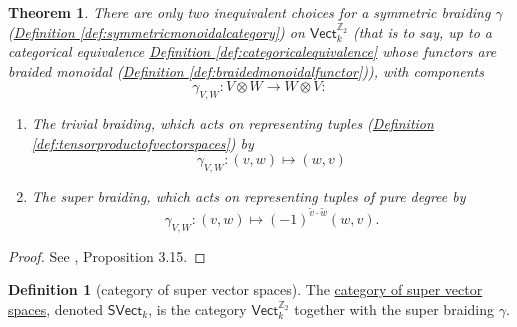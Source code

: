 \documentclass[a4paper,10pt]{scrreprt}
\newcommand{\Z}{\mathbb{Z}}
\newcommand{\defn}[1]{\ul{#1}}
\theoremstyle{definition}
\newtheorem{definition}{Definition}[section]
\theoremstyle{plain}
\newtheorem{theorem}{Theorem}[section]
\theoremstyle{remark}
\begin{document}
\begin{theorem}
  There are only two inequivalent choices for a symmetric braiding $\gamma$ (\hyperref[def:symmetricmonoidalcategory]{Definition \ref*{def:symmetricmonoidalcategory}}) on $\mathsf{Vect}_{k}^{\Z_{2}}$ (that is to say, up to a categorical equivalence \hyperref[def:categoricalequivalence]{Definition \ref*{def:categoricalequivalence}} whose functors are braided monoidal (\hyperref[def:braidedmonoidalfunctor]{Definition \ref*{def:braidedmonoidalfunctor}})),  with components
  \begin{equation*}
    \gamma_{V,W}\colon V \otimes W \to W \otimes V:
  \end{equation*}

  \begin{enumerate}
    \item The \emph{trivial braiding}, which acts on representing tuples (\hyperref[def:tensorproductofvectorspaces]{Definition \ref*{def:tensorproductofvectorspaces}}) by 
      \begin{equation*}
        \gamma_{V, W}\colon (v, w) \mapsto (w, v)
      \end{equation*}

    \item The \emph{super braiding}, which acts on representing tuples of pure degree by
      \begin{equation*}
        \gamma_{V, W}\colon (v, w) \mapsto (-1)^{\tilde{v}\cdot \tilde{w}}(w, v).
      \end{equation*}
  \end{enumerate}
\end{theorem}

\begin{proof}
  See \cite{nlab-deligne-theorem}, Proposition 3.15.
\end{proof}

\begin{definition}[category of super vector spaces]
  \label{def:categoryofsupervectorspaces}
  The \defn{category of super vector spaces}, denoted $\mathsf{SVect}_{k}$, is the category $\mathsf{Vect}_{k}^{\Z_{2}}$ together with the super braiding $\gamma$.
\end{definition}
\end{document}
